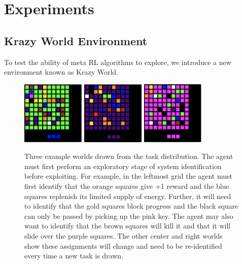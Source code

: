 \documentclass{article} %
\begin{document}
\section{Experiments}

\subsection{Krazy World Environment} 

To test the ability of meta RL algorithms to explore, we introduce a new environment known as Krazy World. 

\begin{figure}[ht]
\begin{center}
\includegraphics[width=30mm]{envs/grid_0.png}\hfill
\includegraphics[width=30mm]{envs/grid_1.png}\hfill
\includegraphics[width=30mm ]{envs/grid_2.png} 
\end{center}
\caption{Three example worlds drawn from the task distribution. The agent must first perform an exploratory stage of system identification before exploiting. For example, in the leftmost grid the agent must first identify that the orange squares give +1 reward and the blue squares replenish its limited supply of energy. Further, it will need to identify that the gold squares block progress and the black square can only be passed by picking up the pink key. The agent may also want to identify that the brown squares will kill it and that it will slide over the purple squares. The other center and right worlds show these assignments will change and need to be re-identified every time a new task is drawn.} %
\end{figure} 
\end{document}

